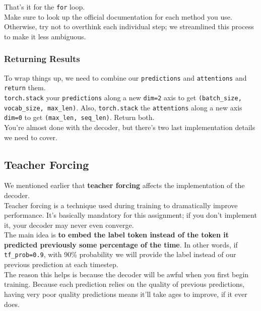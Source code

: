 \documentclass{article}
\newcommand{\ttt}[1]{\texttt{#1}}
\begin{document}
That's it for the \ttt{for} loop. \\

Make sure to look up the official documentation for each method you use. Otherwise, try not to overthink each individual step; we streamlined this process to make it less ambiguous.

\subsubsection{Returning Results}

To wrap things up, we need to combine our \ttt{predictions} and \ttt{attentions} and \ttt{return} them. \\

\ttt{torch.stack} your \ttt{predictions} along a new \ttt{dim=2} axis to get \ttt{(batch\_size, vocab\_size, max\_len)}. Also, \ttt{torch.stack} the \ttt{attentions} along a new axis \ttt{dim=0} to get \ttt{(max\_len, seq\_len)}. Return both. \\

You're almost done with the decoder, but there's two last implementation details we need to cover.

\newpage

\subsection{Teacher Forcing}

We mentioned earlier that \textbf{teacher forcing} affects the implementation of the decoder.\\

Teacher forcing is a technique used during training to dramatically improve performance. It's basically mandatory for this assignment; if you don't implement it, your decoder may never even converge. \\

The main idea is \textbf{to embed the label token instead of the token it predicted previously some percentage of the time}. In other words, if \ttt{tf\_prob=0.9}, with 90\% probability we will provide the label instead of our previous prediction at each timestep. \\

The reason this helps is because the decoder will be awful when you first begin training. Because each prediction relies on the quality of previous predictions, having very poor quality predictions means it'll take ages to improve, if it ever does.
\end{document}

